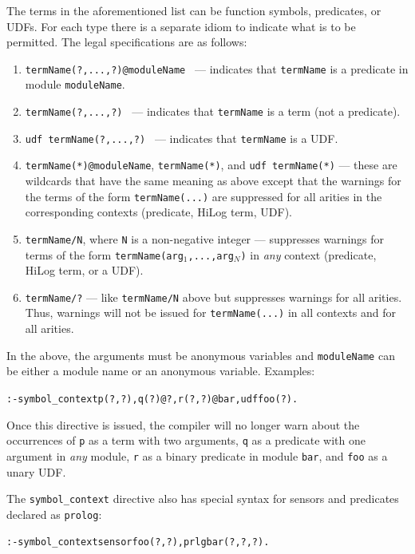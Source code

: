 \documentclass[11pt]{article}
\begin{document}
The terms in the aforementioned list can be function symbols, predicates,
or UDFs. For each type there is a separate idiom to indicate what is to be
permitted.
The legal specifications are as follows:
\begin{enumerate}
\item {\tt termName(?,...,?)@moduleName } --- indicates that
  \texttt{termName} is a predicate in module \texttt{moduleName}.  
\item {\tt termName(?,...,?) } --- indicates that \texttt{termName} is a
  term (not a predicate).
\item {\tt udf termName(?,...,?) } --- indicates that \texttt{termName}
  is a UDF.
\item \texttt{termName(*)@moduleName}, \texttt{termName(*)}, and \texttt{udf
    termName(*)} --- these are wildcards that have the same meaning as
  above except that the warnings for the terms of the form
  \texttt{termName(...)}  are suppressed for all arities in the
  corresponding contexts (predicate, HiLog term, UDF).
\item \texttt{termName/N}, where \texttt{N} is a non-negative integer ---
  suppresses warnings for terms of the form
  \texttt{termName(arg$_1$,...,arg$_N$)} in \emph{any} context (predicate,
  HiLog term, or a UDF).
\item \texttt{termName/?} --- like \texttt{termName/N} above but suppresses
  warnings for all arities. Thus, warnings will not be issued for
  \texttt{termName(...)} in all contexts and for all arities.
\end{enumerate}
In the above, the arguments must be anonymous variables
and \texttt{moduleName} can be either a module name or an anonymous variable.
Examples:
\begin{alltt}
    :- symbol_context p(?,?), q(?)@?, r(?,?)@bar, udf foo(?).
\end{alltt}
Once this directive is issued, the compiler will no longer warn about the
occurrences of \texttt{p} as a term with two arguments, \texttt{q} as a
predicate with one argument in \emph{any} module, \texttt{r} as a binary
predicate in module \texttt{bar}, and \texttt{foo} as a unary UDF.      

The \texttt{symbol\_context} directive also
has special syntax for sensors and predicates declared as
\texttt{prolog}:
\begin{alltt}
   :- symbol_context sensor foo(?,?), prlg bar(?,?,?).
\end{alltt}
\end{document}
